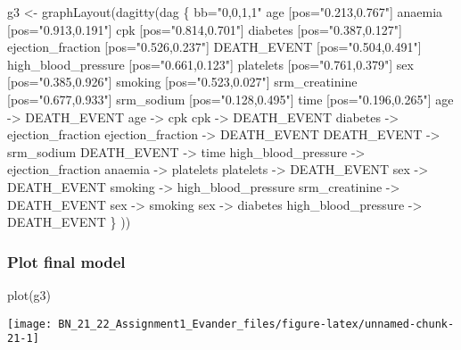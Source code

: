 \documentclass[
]{article}
\newenvironment{Shaded}{\begin{snugshade}}{\end{snugshade}}
\newcommand{\FunctionTok}[1]{\textcolor[rgb]{0.00,0.00,0.00}{#1}}
\newcommand{\NormalTok}[1]{#1}
\newcommand{\OtherTok}[1]{\textcolor[rgb]{0.56,0.35,0.01}{#1}}
\newcommand{\StringTok}[1]{\textcolor[rgb]{0.31,0.60,0.02}{#1}}
\begin{document}
\begin{Shaded}
\begin{Highlighting}[]
\NormalTok{g3 }\OtherTok{\textless{}{-}} \FunctionTok{graphLayout}\NormalTok{(}\FunctionTok{dagitty}\NormalTok{(}\StringTok{\textquotesingle{}dag \{}
\StringTok{bb="0,0,1,1"}
\StringTok{age [pos="0.213,0.767"]}
\StringTok{anaemia [pos="0.913,0.191"]}
\StringTok{cpk [pos="0.814,0.701"]}
\StringTok{diabetes [pos="0.387,0.127"]}
\StringTok{ejection\_fraction [pos="0.526,0.237"]}
\StringTok{DEATH\_EVENT [pos="0.504,0.491"]}
\StringTok{high\_blood\_pressure [pos="0.661,0.123"]}
\StringTok{platelets [pos="0.761,0.379"]}
\StringTok{sex [pos="0.385,0.926"]}
\StringTok{smoking [pos="0.523,0.027"]}
\StringTok{srm\_creatinine [pos="0.677,0.933"]}
\StringTok{srm\_sodium [pos="0.128,0.495"]}
\StringTok{time [pos="0.196,0.265"]}
\StringTok{age {-}\textgreater{} DEATH\_EVENT}
\StringTok{age {-}\textgreater{} cpk}
\StringTok{cpk {-}\textgreater{} DEATH\_EVENT}
\StringTok{diabetes {-}\textgreater{} ejection\_fraction}
\StringTok{ejection\_fraction {-}\textgreater{} DEATH\_EVENT}
\StringTok{DEATH\_EVENT {-}\textgreater{} srm\_sodium}
\StringTok{DEATH\_EVENT {-}\textgreater{} time}
\StringTok{high\_blood\_pressure {-}\textgreater{} ejection\_fraction}
\StringTok{anaemia {-}\textgreater{} platelets}
\StringTok{platelets {-}\textgreater{} DEATH\_EVENT}
\StringTok{sex {-}\textgreater{} DEATH\_EVENT}
\StringTok{smoking {-}\textgreater{} high\_blood\_pressure}
\StringTok{srm\_creatinine {-}\textgreater{} DEATH\_EVENT}
\StringTok{sex {-}\textgreater{} smoking}
\StringTok{sex {-}\textgreater{} diabetes}
\StringTok{high\_blood\_pressure {-}\textgreater{} DEATH\_EVENT}
\StringTok{\}}
\StringTok{\textquotesingle{}}\NormalTok{))}
\end{Highlighting}
\end{Shaded}

\normalsize

\hypertarget{plot-final-model}{%
\subsubsection{Plot final model}\label{plot-final-model}}

\begin{Shaded}
\begin{Highlighting}[]
\FunctionTok{plot}\NormalTok{(g3)}
\end{Highlighting}
\end{Shaded}

\begin{center}\texttt{[image: BN\_21\_22\_Assignment1\_Evander\_files/figure-latex/unnamed-chunk-21-1]} \end{center}
\end{document}
